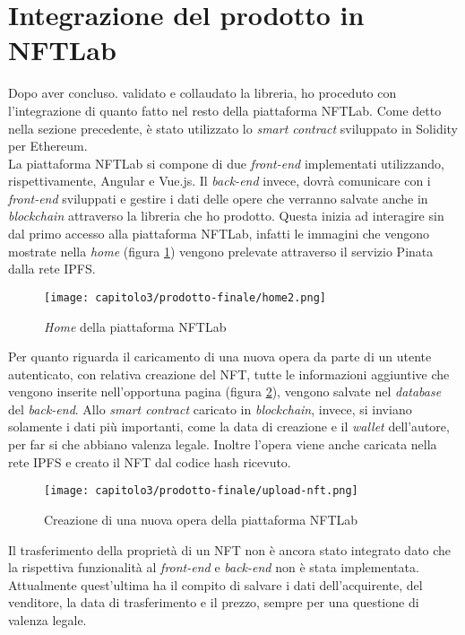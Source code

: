 
\section{Integrazione del prodotto in NFTLab}
Dopo aver concluso. validato e collaudato la libreria, ho proceduto con l'integrazione di quanto fatto nel resto della piattaforma NFTLab. Come detto nella sezione precedente, è stato utilizzato lo \textit{smart contract} sviluppato in Solidity per Ethereum. \\

La piattaforma NFTLab si compone di due \textit{front-end} implementati utilizzando, rispettivamente, Angular e Vue.js. Il \textit{back-end} invece, dovrà comunicare con i \textit{front-end} sviluppati e gestire i dati delle opere che verranno salvate anche in \textit{blockchain} attraverso la libreria che ho prodotto. Questa inizia ad interagire sin dal primo accesso alla piattaforma NFTLab, infatti le immagini che vengono mostrate nella \textit{home} (figura \ref{nftlab:home}) vengono prelevate attraverso il servizio Pinata dalla rete IPFS.

\begin{figure}[h!]
  \centering
  \texttt{[image: capitolo3/prodotto-finale/home2.png]}
  \caption{\textit{Home} della piattaforma NFTLab}
  \label{nftlab:home}
\end{figure}

Per quanto riguarda il caricamento di una nuova opera da parte di un utente autenticato, con relativa creazione del NFT, tutte le informazioni aggiuntive che vengono inserite nell'opportuna pagina (figura \ref{nftlab:upload-new-nft}), vengono salvate nel \textit{database} del \textit{back-end}. Allo \textit{smart contract} caricato in \textit{blockchain}, invece, si inviano solamente i dati più importanti, come la data di creazione e il \textit{wallet} dell'autore, per far si che abbiano valenza legale. Inoltre l'opera viene anche caricata nella rete IPFS e creato il NFT dal codice hash ricevuto.

\begin{figure}[h!]
  \centering
  \texttt{[image: capitolo3/prodotto-finale/upload-nft.png]}
  \caption{Creazione di una nuova opera della piattaforma NFTLab}
  \label{nftlab:upload-new-nft}
\end{figure}

Il trasferimento della proprietà di un NFT non è ancora stato integrato dato che la rispettiva funzionalità al \textit{front-end} e \textit{back-end} non è stata implementata. Attualmente quest'ultima ha il compito di salvare i dati dell'acquirente, del venditore, la data di trasferimento e il prezzo, sempre per una questione di valenza legale.
